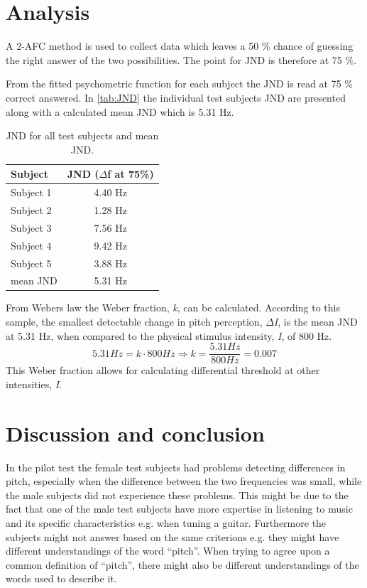 \section*{Analysis}
%
A 2-AFC method is used to collect data which leaves a 50 \% chance of guessing the right answer of the two possibilities. The point for JND is therefore at 75 \%.

From the fitted psychometric function for each subject the JND is read at 75 \% correct answered. In \autoref{tab:JND} the individual test subjects JND are presented along with a calculated mean JND which is 5.31 Hz. 
%
\begin{table}[H]
\centering
\begin{tabular}{l|c}
Subject     & JND ($\Delta$f at 75\%) \\\hline
Subject 1   & 4.40 Hz                 \\\hline
Subject 2   & 1.28 Hz                 \\\hline
Subject 3   & 7.56 Hz                 \\\hline
Subject 4   & 9.42 Hz                 \\\hline
Subject 5   & 3.88 Hz                 \\\hline
mean JND & 5.31 Hz       
\end{tabular}
\caption{JND for all test subjects and mean JND.}
\label{tab:JND}         
\end{table}
\noindent
%
From Webers law the Weber fraction, \textit{k}, can be calculated. According to this sample, the smallest detectable change in pitch perception, \textit{$\Delta$I}, is the mean JND at 5.31 Hz, when compared to the physical stimulus intensity, \textit{I}, of 800 Hz.
% 
\begin{equation}
5.31 Hz = k \cdot 800 Hz \Rightarrow k = \frac{5.31 Hz}{800 Hz} = 0.007
\end{equation}
%
This Weber fraction allows for calculating differential threshold at other intensities, \textit{I}. 
%

\section*{Discussion and conclusion}
%
In the pilot test the female test subjects had problems detecting differences in pitch, especially when the difference between the two frequencies was small, while the male subjects did not experience these problems. This might be due to the fact that one of the male test subjects have more expertise in listening to music and its specific characteristics e.g. when tuning a guitar. Furthermore the subjects might not answer based on the same criterions e.g. they might have different understandings of the word “pitch”. When trying to agree upon a common definition of “pitch”, there might also be different understandings of the words used to describe it.  


